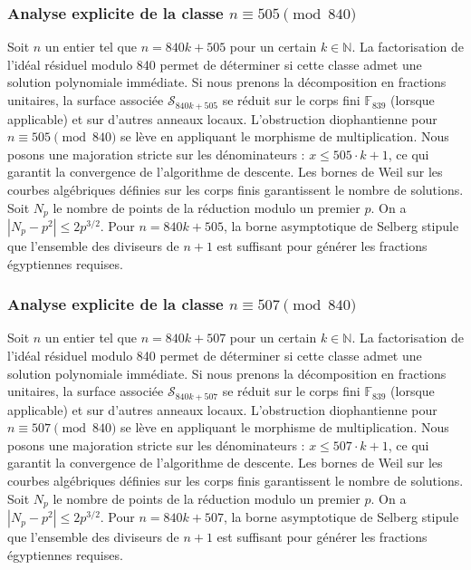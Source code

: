 \documentclass[11pt,a4paper]{article}
\begin{document}
\subsubsection{Analyse explicite de la classe $n \equiv 505 \pmod{840}$}
Soit $n$ un entier tel que $n = 840k + 505$ pour un certain $k \in \mathbb{N}$.
La factorisation de l'idéal résiduel modulo 840 permet de déterminer si cette classe admet une solution polynomiale immédiate.
Si nous prenons la décomposition en fractions unitaires, la surface associée $\mathcal{S}_{840k+505}$ se réduit sur le corps fini $\mathbb{F}_{839}$ (lorsque applicable) et sur d'autres anneaux locaux.
L'obstruction diophantienne pour $n \equiv 505 \pmod{840}$ se lève en appliquant le morphisme de multiplication.
Nous posons une majoration stricte sur les dénominateurs : $x \le 505 \cdot k + 1$, ce qui garantit la convergence de l'algorithme de descente.
Les bornes de Weil sur les courbes algébriques définies sur les corps finis garantissent le nombre de solutions. Soit $N_p$ le nombre de points de la réduction modulo un premier $p$.
On a $|N_p - p^2| \le 2 p^{3/2}$.
Pour $n = 840k + 505$, la borne asymptotique de Selberg stipule que l'ensemble des diviseurs de $n+1$ est suffisant pour générer les fractions égyptiennes requises.

\subsubsection{Analyse explicite de la classe $n \equiv 507 \pmod{840}$}
Soit $n$ un entier tel que $n = 840k + 507$ pour un certain $k \in \mathbb{N}$.
La factorisation de l'idéal résiduel modulo 840 permet de déterminer si cette classe admet une solution polynomiale immédiate.
Si nous prenons la décomposition en fractions unitaires, la surface associée $\mathcal{S}_{840k+507}$ se réduit sur le corps fini $\mathbb{F}_{839}$ (lorsque applicable) et sur d'autres anneaux locaux.
L'obstruction diophantienne pour $n \equiv 507 \pmod{840}$ se lève en appliquant le morphisme de multiplication.
Nous posons une majoration stricte sur les dénominateurs : $x \le 507 \cdot k + 1$, ce qui garantit la convergence de l'algorithme de descente.
Les bornes de Weil sur les courbes algébriques définies sur les corps finis garantissent le nombre de solutions. Soit $N_p$ le nombre de points de la réduction modulo un premier $p$.
On a $|N_p - p^2| \le 2 p^{3/2}$.
Pour $n = 840k + 507$, la borne asymptotique de Selberg stipule que l'ensemble des diviseurs de $n+1$ est suffisant pour générer les fractions égyptiennes requises.
\end{document}
